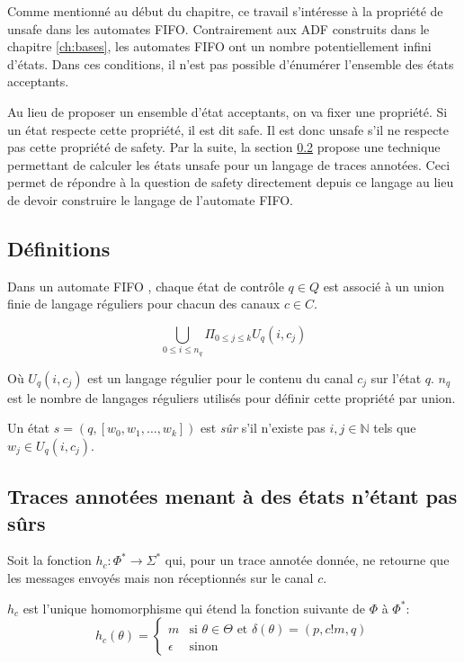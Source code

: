 Comme mentionné au début du chapitre, ce travail s'intéresse à la propriété de unsafe dans les automates FIFO. Contrairement aux ADF construits dans le chapitre \ref{ch:bases}, les automates FIFO ont un nombre potentiellement infini d'états. Dans ces conditions, il n'est pas possible d'énumérer l'ensemble des états acceptants.

Au lieu de proposer un ensemble d'état acceptants, on va fixer une propriété. Si un état respecte cette propriété, il est dit safe. Il est donc unsafe s'il ne respecte pas cette propriété de safety. Par la suite, la section \ref{ss:tracesafety} propose une technique permettant de calculer les états unsafe pour un langage de traces annotées. Ceci permet de répondre à la question de safety directement depuis ce langage au lieu de devoir construire le langage de l'automate FIFO.


\subsection{Définitions}
Dans un automate FIFO \fifo, chaque état de contrôle $q\in Q$ est associé à un union finie de langage réguliers pour chacun des canaux $c\in C$.


$$\bigcup_{0 \leq i \leq n_q}\Pi_{0 \leq j \leq k}U_q(i,c_j)$$

Où $U_q(i,c_j)$ est un langage régulier pour le contenu du canal $c_j$ sur l'état $q$. $n_q$ est le nombre de langages réguliers utilisés pour définir cette propriété par union.

Un état $s=(q,[w_0,w_1,\dots,w_k])$ est \emph{sûr} s'il n'existe pas $i,j \in \mathbb{N}$ tels que $w_j \in U_q(i,c_j)$.



\subsection{Traces annotées menant à des états n'étant pas sûrs}\label{ss:tracesafety}

Soit la fonction $h_c:\Phi^*\rightarrow\Sigma^*$ qui, pour un trace annotée donnée, ne retourne que les messages envoyés mais non réceptionnés sur le canal $c$.

$h_c$ est l'unique homomorphisme qui étend la fonction suivante de $\Phi$ à $\Phi^*$:
$$ h_c(\theta) = \left\{ \begin{array}{ll}
      m & \text{si } \theta\in\Theta\text{ et }\delta(\theta)=(p,c!m,q)\\
      \epsilon & \text{sinon}\end{array} \right. $$



